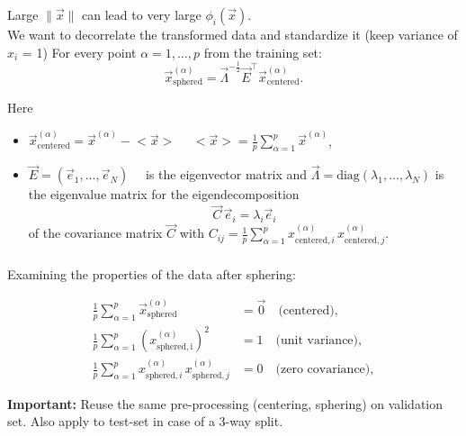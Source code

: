 \begin{frame}\frametitle{\subsecname}

Large $\lVert \vec x \rVert$ can lead to very large $\phi_i(\vec x)$. \\

We want to decorrelate the transformed data and standardize it (keep variance of $x_i$ = 1)
For every point $\alpha=1,\ldots,p$ from the training set:
\begin{equation}
\vec x^{(\alpha)}_\mathrm{sphered} = \vec \Lambda^{-\frac{1}{2}} \vec E^\top \vec x^{(\alpha)}_\mathrm{centered}.
\end{equation}

Here 
\begin{itemize}
 \item[]   
$\vec x^{(\alpha)}_\mathrm{centered} = \vec x^{(\alpha)} - \big<{\vec x}\big>\quad$ 
$\big<{\vec x}\big> = \frac{1}{p} \sum_{\alpha=1}^p \vec x^{(\alpha)}$,
\item[] $\vec E = (\vec e_1, \dots, \vec e_N)\quad$ is the eigenvector matrix and $\vec \Lambda = \mathrm{diag}(\lambda_1, \dots, \lambda_N)$ is the eigenvalue matrix for the eigendecomposition 
$$
\vec C \, \vec e_i = \lambda_i \vec e_i
$$ of the covariance matrix $\vec C$ with $C_{ij} = \frac{1}{p} \sum_{\alpha=1}^p x^{(\alpha)}_{\mathrm{centered},i} \, x^{(\alpha)}_{\mathrm{centered},j}$.
\end{itemize}


\end{frame}

\begin{frame}\frametitle{\subsecname}

Examining the properties of the data after sphering:

\begin{align}
\frac{1}{p}  \sum_{\alpha=1}^{p} \vec x^{(\alpha)}_\mathrm{sphered} &= \vec 0 \quad \text{(centered)},\\
\frac{1}{p}  \sum_{\alpha=1}^{p} (x^{(\alpha)}_\mathrm{sphered,i})^{2} &=  1 \quad \text{(unit variance)},\\
\frac{1}{p}  \sum_{\alpha=1}^{p} x^{(\alpha)}_{\mathrm{sphered},i} \, x^{(\alpha)}_{\mathrm{sphered},j} &= 0 \quad \text{(zero covariance)},
\end{align}

\textbf{Important:} Reuse the same pre-processing (centering, sphering) on validation set. 
Also apply to test-set in case of a 3-way split.

\end{frame}

